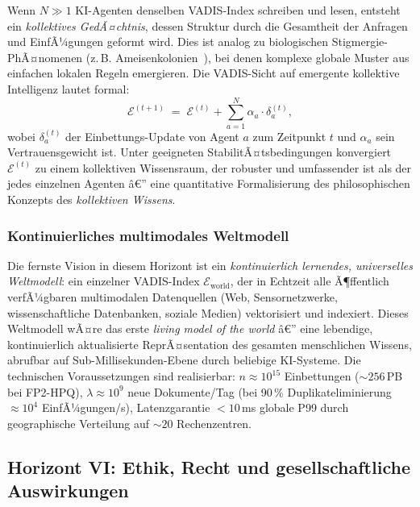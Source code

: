 ﻿\documentclass[12pt,a4paper]{article}
\begin{document}
Wenn $N \gg 1$ KI-Agenten denselben VADIS-Index
schreiben und lesen, entsteht ein \emph{kollektives
GedÃ¤chtnis}, dessen Struktur durch die Gesamtheit
der Anfragen und EinfÃ¼gungen geformt wird.
Dies ist analog zu biologischen Stigmergie-PhÃ¤nomenen
(z.\,B. Ameisenkolonien~\cite{dorigo1999ant}), bei denen
komplexe globale Muster aus einfachen lokalen Regeln emergieren.
Die VADIS-Sicht auf emergente kollektive Intelligenz
lautet formal:
\begin{equation}
  \mathcal{E}^{(t+1)} \;=\; \mathcal{E}^{(t)}
    + \sum_{a=1}^N \alpha_a \cdot \delta_a^{(t)},
\end{equation}
wobei $\delta_a^{(t)}$ der Einbettungs-Update von Agent
$a$ zum Zeitpunkt $t$ und $\alpha_a$ sein Vertrauens\-gewicht
ist. Unter geeigneten StabilitÃ¤tsbedingungen konvergiert
$\mathcal{E}^{(t)}$ zu einem kollektiven Wissensraum,
der robuster und umfassender ist als der jedes
einzelnen Agenten â€” eine quantitative Formalisierung des
philosophischen Konzepts des \emph{kollektiven Wissens}.

\subsubsection{Kontinuierliches multimodales Weltmodell}

Die fernste Vision in diesem Horizont ist ein
\emph{kontinuierlich lernendes, universelles Weltmodell}:
ein einzelner VADIS-Index $\mathcal{E}_{\text{world}}$,
der in Echtzeit alle Ã¶ffentlich verfÃ¼gbaren multimodalen
Datenquellen (Web, Sensornetzwerke, wissenschaftliche
Datenbanken, soziale Medien) vektorisiert und
indexiert. Dieses Weltmodell wÃ¤re das erste
\emph{living model of the world} â€” eine lebendige,
kontinuierlich aktualisierte ReprÃ¤sentation des
gesamten menschlichen Wissens, abrufbar auf
Sub-Millisekunden-Ebene durch beliebige KI-Systeme.
Die technischen Voraussetzungen sind realisierbar:
$n \approx 10^{15}$ Einbettungen ($\sim 256$\,PB bei FP2-HPQ),
$\lambda \approx 10^9$ neue Dokumente/Tag (bei 90\,\%
Duplikateliminierung $\approx 10^4$ EinfÃ¼gungen/s),
Latenzgarantie $< 10$\,ms globale P99 durch geographische
Verteilung auf $\sim 20$ Rechenzentren.

\subsection{Horizont VI: Ethik, Recht und gesellschaftliche
            Auswirkungen}
\label{sub:horizont6}
\end{document}
